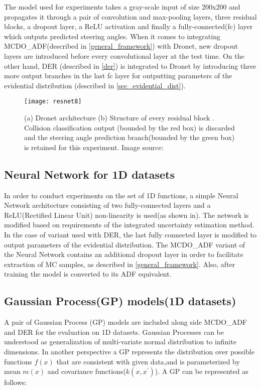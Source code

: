 The model used for experiments takes a gray-scale input of size 200x200 and propagates it through a pair of convolution and max-pooling layers, three residual blocks, a dropout layer, a ReLU activation and finally a fully-connected(fc) layer which outputs predicted steering angles. When it comes to integrating MCDO\_ADF(described in \ref{general_framework}) with Dronet, new dropout layers are introduced before every convolutional layer at the test time. On the other hand, DER (described in \ref{der}) is integrated to Dronet by introducing three more output branches in the last fc layer for outputting parameters of the evidential distribution (described in \ref{sec_evidential_dist}).
\begin{figure}
	\texttt{[image: resnet8]}
	\caption{(a) Dronet architecture (b) Structure of every residual block . Collision classification output (bounded by the red box) is discarded and the steering angle prediction branch(bounded by the green box) is retained for this experiment.  Image source: }
	\label{fig_resnet8}
\end{figure}
\subsection{Neural Network for 1D datasets}\label{1D_net}
In order to conduct experiments on the set of 1D functions, a simple Neural Network architecture consisting of two fully-connected layers and a ReLU(Rectified Linear Unit) non-linearity is used(as shown in). The network is modified based on requirements of the integrated uncertainty estimation method. In the case of variant used with DER, the last fully connected layer is modified to output parameters of the evidential distribution. The MCDO\_ADF variant of the Neural Network contains an additional dropout layer in order to facilitate extraction of MC samples, as described in \ref{general_framework}. Also, after training the model is converted to its ADF equivalent.
\subsection{Gaussian Process(GP) models(1D datasets)}
A pair of Gaussian Process (GP) models are included along side MCDO\_ADF and DER for the evaluation on 1D datasets. Gaussian Processes can be understood as generalization of multi-variate normal distribution to infinite dimensions. In another perspective a GP represents the distribution over possible functions $f(x)$ that are consistent with given data,and is parameterized by mean $m(x)$ and covariance functions($k(x, x^\prime)$). A GP can be represented as follows:

